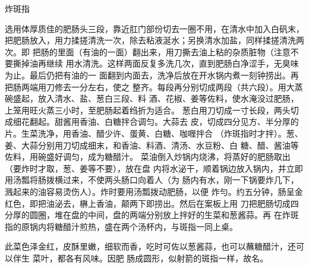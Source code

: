 \begin{recipe}{炸斑指}

\ingredients


\cooking

\step 选用体厚质佳的肥肠头三段，靠近肛门部份切去一圈不用，在清水中加入白矾末，
把肥肠放入，用力揉搓清洗一次，除去粘液涎水；另换清水加盐，同样揉搓清洗两次。即
把肠的里面（有油的一面）翻出来，用刀撕去油上粘的杂质脏物（注意不要撕掉油再继续
用水清洗。这样两面反复多洗几次，直到肥肠白净涩手，无臭味为止。最后仍把有油的一
面翻到内面去，洗净后放在开水锅内煮一刻钟捞出。再把肠两端用刀修去一分左右，使之
整齐。每段再分别切成两段（共六段）。用大蒸碗盛起，放入清水、盐、葱白三段、料
酒、花椒、姜等佐料，使水淹没过肥肠，上笼用旺火蒸三小时，至肥肠起着绉折为适合。
\step 葱白用刀切成一寸长段，两头切成细花翻起。甜酱用香油、白糖拌合调匀。大蒜去
皮，切成四分见方、半分厚的片。生菜洗净，用香油、醋少许、蛋黄、白糖、咖喱拌合
（炸斑指时才拌）。葱、姜、大蒜分别用刀切成细末，和香油、料酒、清汤、水豆粉、白
糖、醋、酱油等佐料，用碗盛好调匀，成为糖醋汁。
\step 菜油倒入炒锅内烧沸，将蒸好的肥肠取出（要炸时才取，葱、姜等不要），放在盘
内将水泌干，顺着锅边放入锅内，并立即用汤瓢将肠拨横过来，不使两头肠口向着人（为
肠内有水，刚一下锅要炸几下，溅起来的油容易烫伤人）。炸时要用汤瓢拨动肥肠，以便
炸勻。约五分钟，肠呈金红色，即把油泌去，楙上香油，颠两下即捞出。然后在案板上用
刀把肥肠切成四分厚的圆圈，堆在盘的中间，盘的两端分别放上拌好的生菜和葱酱蒜。再
在炸斑指的原锅内将糖醋汁煎热，盛在两个汤杯内，与斑指一同上桌。

\notes

此菜色泽金红，皮酥里嫩，细软而香，吃时可佐以葱酱蒜，也可以蘸糖醋汁，还可以伴生
菜叶，都各有风味。因肥 肠成圆形，似射箭的斑指一样，故名。

\end{recipe}

